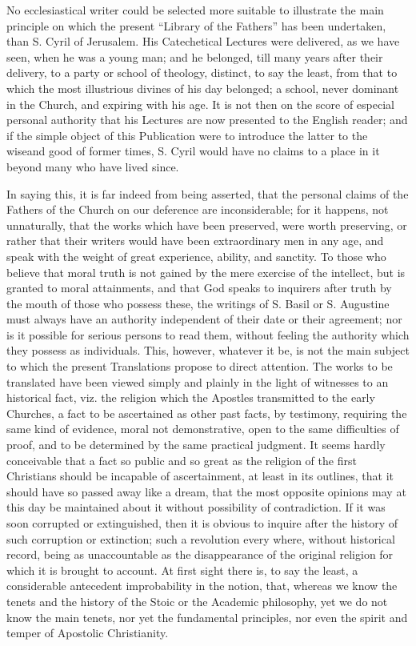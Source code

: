 No ecclesiastical writer could
be selected more suitable to illustrate the main principle on which
the present ``Library of the Fathers'' has been undertaken, than S.
Cyril of Jerusalem. His Catechetical Lectures were delivered, as we
have seen, when he was a young man; and he belonged, till many years
after their delivery, to a party or school of theology, distinct, to
say the least, from that to which the most illustrious divines of his
day belonged; a school, never dominant in the Church, and expiring
with his age. It is not then on the score of especial personal
authority that his Lectures are now presented to the English reader;
and if the simple object of this Publication were to introduce the
latter to the wise\emph{}and good of former times, S. Cyril would
have no claims to a place in it beyond many who have lived since.

In saying this, it is far
indeed from being asserted, that the personal claims of the Fathers of
the Church on our deference are inconsiderable; for it happens, not
unnaturally, that the works which have been preserved, were worth
preserving, or rather that their writers would have been extraordinary
men in any age, and speak with the weight of great experience,
ability, and sanctity. To those who believe that moral truth is not
gained by the mere exercise of the intellect, but is granted to moral
attainments, and that God speaks to inquirers after truth by the mouth
of those who possess these, the writings of S. Basil or S. Augustine
must always have an authority independent of their date or their
agreement; nor is it possible for serious persons to read them,
without feeling the authority which they possess as individuals. This,
however, whatever it be, is not the main subject to which the
present Translations propose to direct attention. The works to be
translated have been viewed simply and plainly in the light of
witnesses to an historical fact, viz. the religion which the Apostles
transmitted to the early Churches, a fact to be ascertained as other
past facts, by testimony, requiring the same kind of evidence, moral
not demonstrative, open to the same difficulties of proof, and to be
determined by the same practical judgment. It seems hardly conceivable
that a fact so public and so great as the religion of the first
Christians should be incapable of ascertainment, at least in its
outlines, that it should have so passed away like a dream, that the
most opposite opinions may at this day be maintained about it without
possibility of contradiction. If it was soon corrupted or
extinguished, then it is obvious to inquire after the history of such
corruption or extinction; such a revolution every where, without
historical record, being as unaccountable as the disappearance of the
original religion for which it is brought to account. At first sight
there is, to say the least, a considerable antecedent improbability in
the notion, that, whereas we know the tenets and the history of the
Stoic or the Academic philosophy, yet we do not know the main tenets,
nor yet the fundamental principles, nor even the spirit and temper of
Apostolic Christianity.

